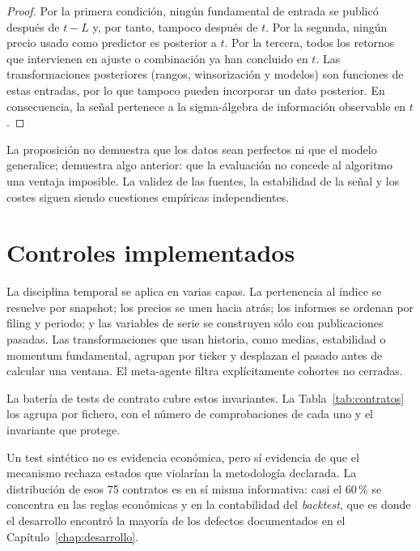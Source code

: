 \begin{proof}
Por la primera condición, ningún fundamental de entrada se publicó después
de $t-L$ y, por tanto, tampoco después de $t$. Por la segunda, ningún precio usado como predictor
es posterior a $t$. Por la tercera, todos los retornos que intervienen en ajuste o combinación ya
han concluido en $t$. Las transformaciones posteriores (rangos, winsorización y modelos) son
funciones de estas entradas, por lo que tampoco pueden incorporar un dato posterior. En
consecuencia, la señal pertenece a la sigma-álgebra de información observable en $t$.
\end{proof}

La proposición no demuestra que los datos sean perfectos ni que el modelo generalice; demuestra algo
anterior: que la evaluación no concede al algoritmo una ventaja imposible. La validez de las fuentes,
la estabilidad de la señal y los costes siguen siendo cuestiones empíricas independientes.

\section{Controles implementados}

La disciplina temporal se aplica en varias capas. La pertenencia al índice se resuelve por snapshot;
los precios se unen hacia atrás; los informes se ordenan por filing y periodo; y las variables de
serie se construyen sólo con publicaciones pasadas. Las transformaciones que usan historia, como
medias, estabilidad o momentum fundamental, agrupan por ticker y desplazan el pasado antes de
calcular una ventana. El meta-agente filtra explícitamente cohortes no cerradas.

La batería de tests de contrato cubre estos invariantes. La Tabla~\ref{tab:contratos} los agrupa por
fichero, con el número de comprobaciones de cada uno y el invariante que protege.

\begin{table}[H]
  \centering
  \footnotesize
  \caption{Batería de contratos que protege los invariantes metodológicos.}
  \label{tab:contratos}
  
  \caption*{Fuente: recuento de funciones \texttt{test\_*} en  del repositorio.}
\end{table}

Un test sintético no es evidencia económica, pero sí evidencia de que el mecanismo rechaza estados
que violarían la metodología declarada. La distribución de esos 75 contratos es en sí misma
informativa: casi el 60\,\% se concentra en las reglas económicas y en la contabilidad del
\textit{backtest}, que es donde el desarrollo encontró la mayoría de los defectos documentados en el
Capítulo~\ref{chap:desarrollo}.

